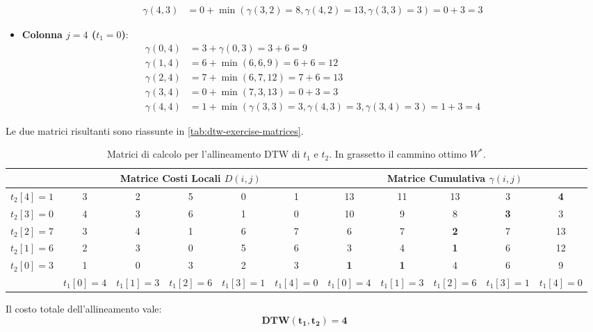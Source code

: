 \begin{itemize}
\begin{align*}
    \gamma(4,3) &= 0 + \min(\gamma(3,2)=8, \gamma(4,2)=13, \gamma(3,3)=3) = 0 + 3 = 3
    \end{align*}
    \item \textbf{Colonna $j=4$ ($t_1=0$)}:
    \begin{align*}
    \gamma(0,4) &= 3 + \gamma(0,3) = 3 + 6 = 9 \\
    \gamma(1,4) &= 6 + \min(6, 6, 9) = 6 + 6 = 12 \\
    \gamma(2,4) &= 7 + \min(6, 7, 12) = 7 + 6 = 13 \\
    \gamma(3,4) &= 0 + \min(7, 3, 13) = 0 + 3 = 3 \\
    \gamma(4,4) &= 1 + \min(\gamma(3,3)=3, \gamma(4,3)=3, \gamma(3,4)=3) = 1 + 3 = 4
    \end{align*}
\end{itemize}

Le due matrici risultanti sono riassunte in \autoref{tab:dtw-exercise-matrices}.

\begin{table}[H]
\centering
\tiny
\setlength{\tabcolsep}{2.5pt}
\renewcommand{\arraystretch}{1.2}
\begin{tabular}{c | c c c c c | c c c c c}
\toprule
& \multicolumn{5}{c|}{\textbf{Matrice Costi Locali $D(i,j)$}} & \multicolumn{5}{c}{\textbf{Matrice Cumulativa $\gamma(i,j)$}} \\
\midrule
$t_2[4]=1$ & 3 & 2 & 5 & 0 & 1 & 13 & 11 & 13 & 3 & \textbf{4} \\
$t_2[3]=0$ & 4 & 3 & 6 & 1 & 0 & 10 & 9 & 8 & \textbf{3} & 3 \\
$t_2[2]=7$ & 3 & 4 & 1 & 6 & 7 & 6 & 7 & \textbf{2} & 7 & 13 \\
$t_2[1]=6$ & 2 & 3 & 0 & 5 & 6 & 3 & 4 & \textbf{1} & 6 & 12 \\
$t_2[0]=3$ & 1 & 0 & 3 & 2 & 3 & \textbf{1} & \textbf{1} & 4 & 6 & 9 \\
\midrule
& $t_1[0]=4$ & $t_1[1]=3$ & $t_1[2]=6$ & $t_1[3]=1$ & $t_1[4]=0$ & $t_1[0]=4$ & $t_1[1]=3$ & $t_1[2]=6$ & $t_1[3]=1$ & $t_1[4]=0$ \\
\bottomrule
\end{tabular}
\caption{Matrici di calcolo per l'allineamento DTW di $t_1$ e $t_2$. In grassetto il cammino ottimo $W^*$.}
\label{tab:dtw-exercise-matrices}
\end{table}

Il costo totale dell'allineamento vale:
\begin{equation}
\label{eq:dtw-ex-result}
\mathbf{\text{DTW}(t_1, t_2) = 4}
\end{equation}

